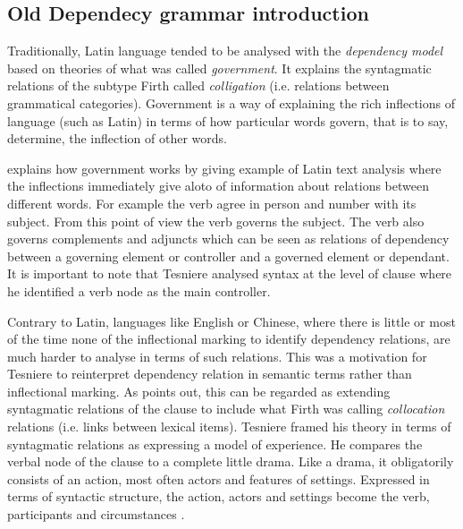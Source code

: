 \subsection{Old Dependecy grammar introduction}
Traditionally, Latin language tended to be analysed with the \textit{dependency model} based on theories of what was called \textit{government}. It explains the syntagmatic relations of the subtype Firth called \textit{colligation} (i.e. relations between grammatical categories). Government is a way of explaining the rich inflections of language (such as Latin) in terms of how particular words govern, that is to say, determine, the inflection of other words. \citep[p.66]{McDonald2008}

\citet{Tesniere2015} explains how government works by giving example of Latin text analysis where the inflections immediately give aloto of information about relations between different words. For example the verb agree in person and number with its subject. From this point of view the verb governs the subject. The verb also governs complements and adjuncts which can be seen as relations of dependency between a governing element or controller and a governed element or dependant. It is important to note that Tesniere analysed syntax at the level of clause where he identified a verb node as the main controller. 

Contrary to Latin, languages like English or Chinese, where there is little or most of the time none of the inflectional marking to identify dependency relations, are much harder to analyse in terms of such relations. This was a motivation for Tesniere to reinterpret dependency relation in semantic terms rather than inflectional marking. As \citet{McDonald2008} points out, this can be regarded as extending syntagmatic relations of the clause to include what Firth was calling \textit{collocation} relations (i.e. links between lexical items). Tesniere framed his theory in terms of syntagmatic relations as expressing a model of experience. He compares the verbal node of the clause to a complete little drama. Like a drama, it obligatorily consists of an action, most often actors and features of settings. Expressed in terms of syntactic structure, the action, actors and settings become the verb, participants and circumstances \citep{Tesniere2015}. 

